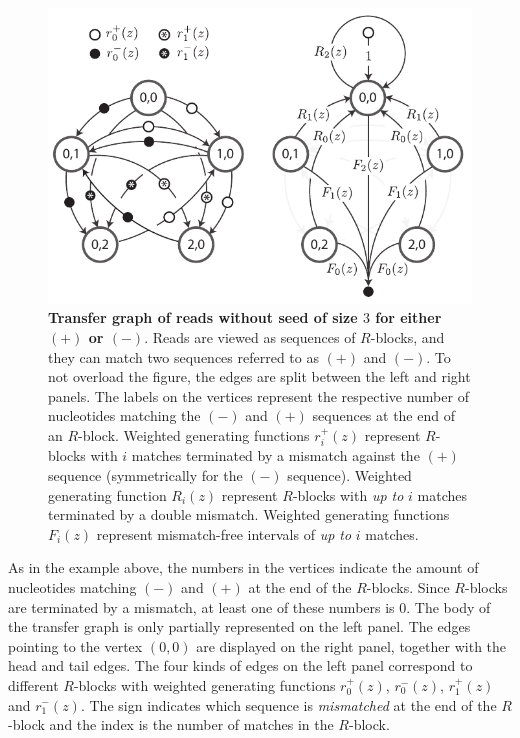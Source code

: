\documentclass{article}
\begin{document}
\begin{figure}[h]
\centering
\includegraphics[scale=1]{false_positives_graph.pdf}
\caption{\textbf{Transfer graph of reads without seed of size $3$ for
either $(+)$ or $(-)$}. Reads are viewed as sequences of $R$-blocks, and
they can match two sequences referred to as $(+)$ and $(-)$. To not
overload the figure, the edges are split between the left and right
panels. The labels on the vertices represent the respective number of
nucleotides matching the $(-)$ and $(+)$ sequences at the end of an
$R$-block. Weighted generating functions $r_i^+(z)$ represent $R$-blocks
with $i$ matches terminated by a mismatch against the $(+)$ sequence
(symmetrically for the $(-)$ sequence). Weighted generating function
$R_i(z)$ represent $R$-blocks with \emph{up to} $i$ matches terminated by
a double mismatch. Weighted generating functions $F_i(z)$ represent
mismatch-free intervals of \emph{up to} $i$ matches.}
\label{fig:graph_fp}
\end{figure}

As in the example above, the numbers in the vertices indicate the amount
of nucleotides matching $(-)$ and $(+)$ at the end of the $R$-blocks.
Since $R$-blocks are terminated by a mismatch, at least one of these
numbers is $0$. The body of the transfer graph is only partially
represented on the left panel. The edges pointing to the vertex $(0,0)$
are displayed on the right panel, together with the head and tail edges.
The four kinds of edges on the left panel correspond to different
$R$-blocks with weighted generating functions $r_0^+(z)$, $r_0^-(z)$,
$r_1^+(z)$ and $r_1^-(z)$. The sign indicates which sequence is
\emph{mismatched} at the end of the $R$-block and the index is the number
of matches in the $R$-block.
\end{document}
